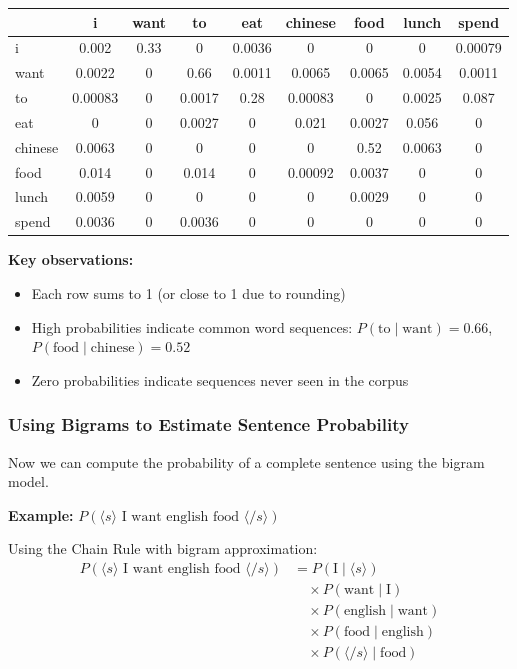 \documentclass[11pt,a4paper]{article}
\theoremstyle{definition}
\theoremstyle{plain}
\theoremstyle{remark}
\begin{document}
\begin{center}
\begin{tabular}{|l||c|c|c|c|c|c|c|c|}
\hline
 & i & want & to & eat & chinese & food & lunch & spend \\
\hline\hline
i & 0.002 & 0.33 & 0 & 0.0036 & 0 & 0 & 0 & 0.00079 \\
want & 0.0022 & 0 & 0.66 & 0.0011 & 0.0065 & 0.0065 & 0.0054 & 0.0011 \\
to & 0.00083 & 0 & 0.0017 & 0.28 & 0.00083 & 0 & 0.0025 & 0.087 \\
eat & 0 & 0 & 0.0027 & 0 & 0.021 & 0.0027 & 0.056 & 0 \\
chinese & 0.0063 & 0 & 0 & 0 & 0 & 0.52 & 0.0063 & 0 \\
food & 0.014 & 0 & 0.014 & 0 & 0.00092 & 0.0037 & 0 & 0 \\
lunch & 0.0059 & 0 & 0 & 0 & 0 & 0.0029 & 0 & 0 \\
spend & 0.0036 & 0 & 0.0036 & 0 & 0 & 0 & 0 & 0 \\
\hline
\end{tabular}
\end{center}

\textbf{Key observations:}
\begin{itemize}
    \item Each row sums to 1 (or close to 1 due to rounding)
    \item High probabilities indicate common word sequences: $P(\text{to} \mid \text{want}) = 0.66$, $P(\text{food} \mid \text{chinese}) = 0.52$
    \item Zero probabilities indicate sequences never seen in the corpus
\end{itemize}

\subsubsection{Using Bigrams to Estimate Sentence Probability}

Now we can compute the probability of a complete sentence using the bigram model.

\textbf{Example:} $P(\langle s \rangle \text{ I want english food } \langle /s \rangle)$

Using the Chain Rule with bigram approximation:
\begin{align*}
P(\langle s \rangle \text{ I want english food } \langle /s \rangle) &= P(\text{I} \mid \langle s \rangle) \\
&\quad \times P(\text{want} \mid \text{I}) \\
&\quad \times P(\text{english} \mid \text{want}) \\
&\quad \times P(\text{food} \mid \text{english}) \\
&\quad \times P(\langle /s \rangle \mid \text{food})
\end{align*}
\end{document}
